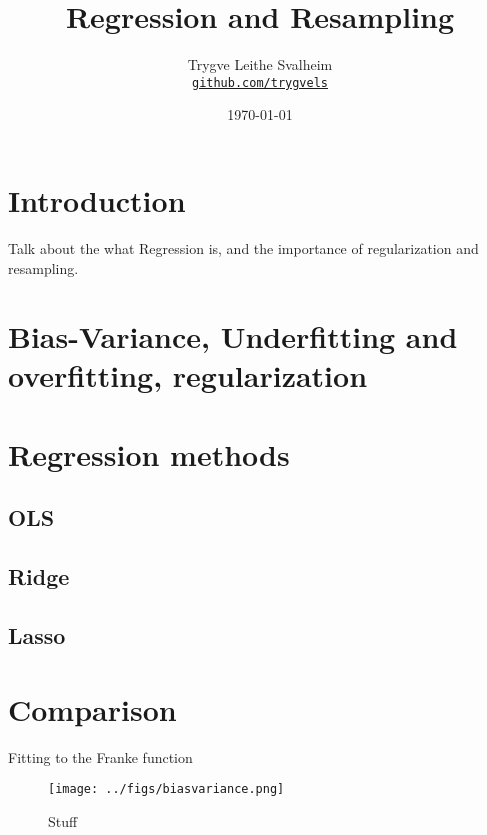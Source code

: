\documentclass[10pt, a4paper]{amsart}
\title[Regression and Resampling]{Regression and Resampling} \\
\author[Svalheim]{Trygve Leithe Svalheim \\
  \href{https://github.com/trygvels/}{\texttt{github.com/trygvels}}}
\date{\today}
\begin{document}
\begin{titlepage}
\begin{abstract}

\end{abstract}
\maketitle
\tableofcontents
\end{titlepage}

\section{Introduction}
Talk about the what Regression is, and the importance of regularization and resampling.

\section{Bias-Variance, Underfitting and overfitting, regularization}

\section{Regression methods}

\subsection{OLS}
\subsection{Ridge}
\subsection{Lasso}

\section{Comparison}
Fitting to the Franke function



\begin{figure}
	\centering
	\texttt{[image: ../figs/biasvariance.png]}
	\caption{Stuff}
	\label{fig:distribution}
\end{figure}
\end{document}
